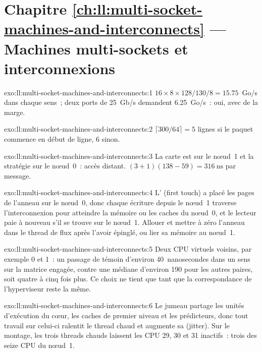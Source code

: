 \section*{Chapitre \ref{ch:ll:multi-socket-machines-and-interconnects} --- Machines multi-sockets et interconnexions}

\begin{solution}{exo:ll:multi-socket-machines-and-interconnects:1}
$16 \times 8 \times 128/130/8 = 15.75$~Go/s dans chaque sens~; deux ports de 25~Gb/s demandent 6.25~Go/s~: oui, avec de la marge.
\end{solution}

\begin{solution}{exo:ll:multi-socket-machines-and-interconnects:2}
$\lceil 300/64 \rceil = 5$ lignes si le paquet commence en début de ligne, 6 sinon.
\end{solution}

\begin{solution}{exo:ll:multi-socket-machines-and-interconnects:3}
La carte est sur le nœud~1 et la stratégie sur le nœud~0~: accès distant. $(3 + 1)(138 - 59) = \qty{316}{\nano\second}$ par message.
\end{solution}

\begin{solution}{exo:ll:multi-socket-machines-and-interconnects:4}
L' (first touch) a placé les pages de l'anneau sur le nœud~0, donc chaque écriture depuis le nœud~1 traverse
l'interconnexion pour atteindre la mémoire ou les caches du nœud~0, et le lecteur paie à nouveau s'il se trouve sur le
nœud~1. Allouer et mettre à zéro l'anneau dans le thread de flux après l'avoir épinglé, ou lier sa mémoire au nœud~1.
\end{solution}

\begin{solution}{exo:ll:multi-socket-machines-and-interconnects:5}
Deux CPU virtuels voisins, par exemple 0 et 1~: un passage de témoin d'environ 40~nanosecondes dans un sens sur la
matrice engagée, contre une médiane d'environ 190 pour les autres paires, soit quatre à cinq fois plus. Ce choix ne tient
que tant que la correspondance de l'hyperviseur reste la même.
\end{solution}

\begin{solution}{exo:ll:multi-socket-machines-and-interconnects:6}
Le jumeau partage les unités d'exécution du cœur, les caches de premier niveau et les prédicteurs, donc tout travail sur
celui-ci ralentit le thread chaud et augmente sa  (jitter). Sur le montage, les trois threads chauds laissent les CPU 29, 30 et 31 inactifs~: trois des seize CPU du nœud~1.
\end{solution}

